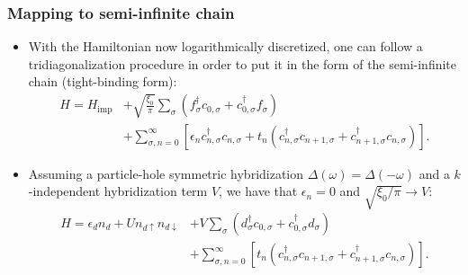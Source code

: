 \documentclass{beamer}
\begin{document}
\begin{frame}
  \frametitle{Mapping to semi-infinite chain}

  \begin{itemize}
  \item With the Hamiltonian now logarithmically discretized, one can follow a tridiagonalization procedure in order to put it in the form of the semi-infinite chain (tight-binding form):
    \begin{align*}
      H = H_{\mathrm{imp}} &+ \sqrt{\frac{\xi_0}{\pi}}\sum_\sigma (f^\dagger_\sigma c_{0,\sigma} + c^\dagger_{0,\sigma}f_\sigma) \\
      &+ \sum_{\sigma,n=0}^{\infty} \left[ \epsilon_n c^\dagger_{n,\sigma}c_{n,\sigma} + t_n(c^\dagger_{n,\sigma}c_{n+1,\sigma} + c^\dagger_{n+1,\sigma}c_{n,\sigma}) \right].
    \end{align*}
  \item Assuming a particle-hole symmetric hybridization $\Delta(\omega) = \Delta(-\omega)$ and a $k$-independent hybridization term $V$, we have that $\epsilon_n = 0$ and $\sqrt{\xi_0/\pi} \rightarrow V$:
    \begin{align*}
      H = \epsilon_d n_d + Un_{d\uparrow}n_{d\downarrow} &+ V\sum_\sigma (d^\dagger_\sigma c_{0,\sigma} + c^\dagger_{0,\sigma} d_\sigma) \\
      &+ \sum_{\sigma,n=0}^{\infty} \left[t_n(c^\dagger_{n,\sigma}c_{n+1,\sigma} + c^\dagger_{n+1,\sigma}c_{n,\sigma}) \right].
    \end{align*}
  \end{itemize}
\end{frame}
\end{document}
